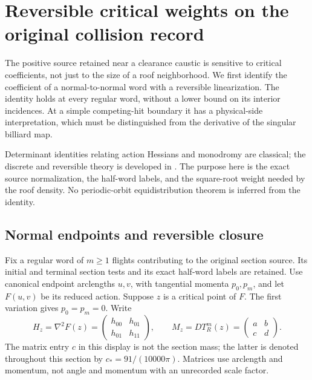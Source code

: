 \section{Reversible critical weights on the original collision record}
\label{sec:v65-reversible-critical}
The positive source retained near a clearance caustic is sensitive to
critical coefficients, not just to the size of a roof neighborhood.
We first identify the coefficient of a normal-to-normal word with a
reversible linearization. The identity holds at every regular word,
without a lower bound on its interior incidences. At a simple
competing-hit boundary it has a physical-side interpretation, which
must be distinguished from the derivative of the singular billiard map.

Determinant identities relating action Hessians and monodromy are
classical; the discrete and reversible theory is developed in
\cite{BT65}. The purpose here is the exact source normalization, the
half-word labels, and the square-root weight needed by the roof density.
No periodic-orbit equidistribution theorem is inferred from the identity.

\subsection{Normal endpoints and reversible closure}
Fix a regular word of $m\ge1$ flights contributing to the original
section source. Its initial and terminal section tests and its exact
half-word labels are retained. Use canonical endpoint
arclengths $u,v$, with tangential momenta $p_0,p_m$, and let $F(u,v)$
be its reduced action. Suppose $z$ is a critical point of $F$.
The first variation gives $p_0=p_m=0$. Write
\begin{equation}\label{eq:v65-hessian-data}
 H_z=\nabla^2F(z)=
 \begin{pmatrix}h_{00}&h_{01}\\h_{01}&h_{11}\end{pmatrix},\qquad
 M_z=D T_R^m(z)=\begin{pmatrix}a&b\\c&d\end{pmatrix}.
\end{equation}
The matrix entry $c$ in this display is not the section mass; the
latter is denoted throughout this section by $c_*=91/(10000\pi)$.
Matrices use arclength and momentum, not angle and momentum with an
unrecorded scale factor.

